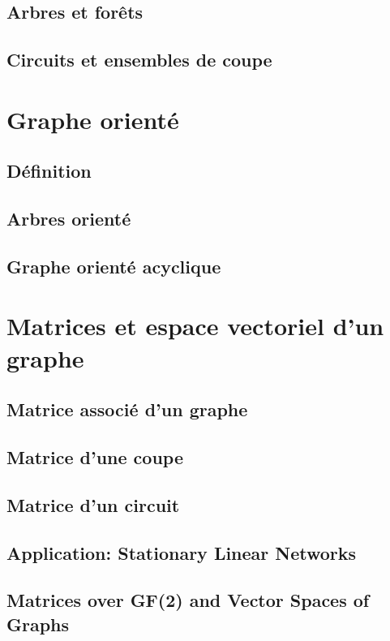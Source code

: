 \subsection{Arbres et forêts}

\subsection{Circuits et ensembles de coupe}

\section{Graphe orienté}
\subsection{Définition}

\subsection{Arbres orienté}

\subsection{Graphe orienté acyclique}

\section{Matrices et espace vectoriel d'un graphe}
\subsection{Matrice associé d'un graphe}
\subsection{Matrice d'une coupe}
\subsection{Matrice  d'un circuit}
\subsection{Application: Stationary Linear Networks}
\subsection{Matrices over GF(2) and Vector Spaces of Graphs}

